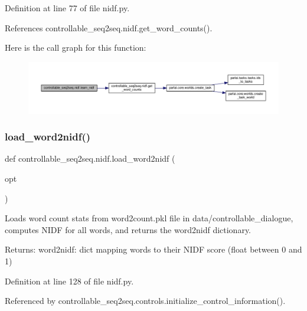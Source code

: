Definition at line 77 of file nidf.\+py.



References controllable\+\_\+seq2seq.\+nidf.\+get\+\_\+word\+\_\+counts().

Here is the call graph for this function\+:
\nopagebreak
\begin{figure}[H]
\begin{center}
\leavevmode
\includegraphics[width=350pt]{namespacecontrollable__seq2seq_1_1nidf_af8dba0db3cab81647b00a17f0a153ad3_cgraph}
\end{center}
\end{figure}
\mbox{\label{namespacecontrollable__seq2seq_1_1nidf_abeea1f9ad5a454af61b4744b6fcc553f}} 
\subsubsection{\texorpdfstring{load\+\_\+word2nidf()}{load\_word2nidf()}}
{\footnotesize\ttfamily def controllable\+\_\+seq2seq.\+nidf.\+load\+\_\+word2nidf (\begin{DoxyParamCaption}\item[{}]{opt }\end{DoxyParamCaption})}

\begin{DoxyVerb}Loads word count stats from word2count.pkl file in data/controllable_dialogue,
computes NIDF for all words, and returns the word2nidf dictionary.

Returns:
  word2nidf: dict mapping words to their NIDF score (float between 0 and 1)
\end{DoxyVerb}
 

Definition at line 128 of file nidf.\+py.



Referenced by controllable\+\_\+seq2seq.\+controls.\+initialize\+\_\+control\+\_\+information().

